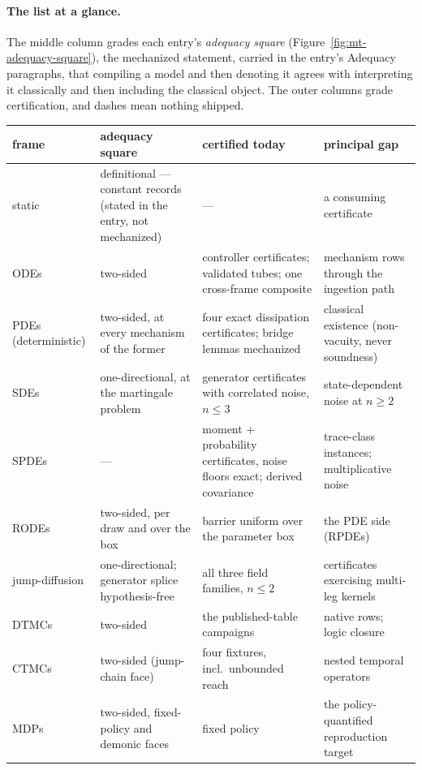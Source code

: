 \paragraph{The list at a glance.} The middle column grades each
entry's \emph{adequacy square}
(Figure~\ref{fig:mt-adequacy-square}), the mechanized statement,
carried in the entry's Adequacy paragraphs, that compiling a model
and then denoting it agrees with interpreting it classically and
then including the classical object. The outer columns grade
certification, and dashes mean nothing shipped.

\begin{center}\small
\begin{tabular}{@{}l>{\raggedright\arraybackslash}p{3.1cm}>{\raggedright\arraybackslash}p{3.6cm}>{\raggedright\arraybackslash}p{3.4cm}@{}}
\toprule
frame & adequacy square & certified today & principal gap \\
\midrule
static & definitional --- constant records (stated in the entry, not mechanized) & --- & a consuming certificate \\
ODEs & two-sided & controller certificates; validated tubes; one cross-frame composite & mechanism rows through the ingestion path \\
PDEs (deterministic) & two-sided, at every mechanism of the former & four exact dissipation certificates; bridge lemmas mechanized & classical existence (non-vacuity, never soundness) \\
SDEs & one-directional, at the martingale problem & generator certificates with correlated noise, $n \le 3$ & state-dependent noise at $n \ge 2$ \\
SPDEs & --- & moment + probability certificates, noise floors exact; derived covariance & trace-class instances; multiplicative noise \\
RODEs & two-sided, per draw and over the box & barrier uniform over the parameter box & the PDE side (RPDEs) \\
jump-diffusion & one-directional; generator splice hypothesis-free & all three field families, $n \le 2$ & certificates exercising multi-leg kernels \\
DTMCs & two-sided & the published-table campaigns & native rows; logic closure \\
CTMCs & two-sided (jump-chain face) & four fixtures, incl.\ unbounded reach & nested temporal operators \\
MDPs & two-sided, fixed-policy and demonic faces & fixed policy & the policy-quantified reproduction target \\

\end{tabular}
\end{center}
